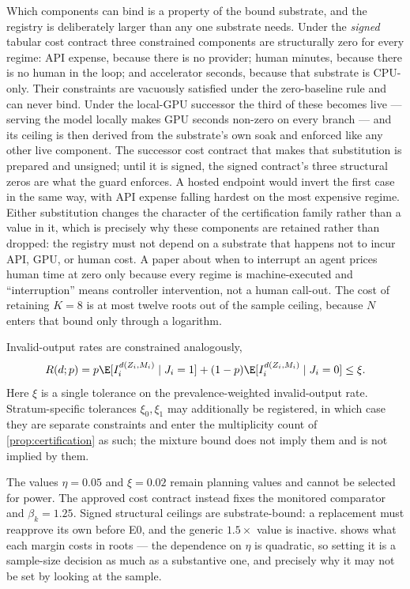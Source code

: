 Which components can bind is a property of the bound substrate, and the registry
is deliberately larger than any one substrate needs.  Under the \emph{signed}
tabular cost contract three constrained components are structurally zero for
every regime: API expense, because there is no provider; human minutes, because
there is no human in the loop; and accelerator seconds, because that substrate
is CPU-only.  Their constraints are vacuously satisfied under the zero-baseline
rule and can never bind.  Under the local-GPU successor the third of these
becomes live --- serving the model locally makes GPU seconds non-zero on every
branch --- and its ceiling is then derived from the substrate's own soak and
enforced like any other live component.  The successor cost contract that makes
that substitution is prepared and unsigned; until it is signed, the signed
contract's three structural zeros are what the guard enforces.  A hosted endpoint would invert the first case in the same way,
with API expense falling hardest on the most expensive regime.  Either
substitution changes the character of the certification family rather than a
value in it, which is precisely why these components are retained rather than
dropped: the registry must not depend on a
substrate that happens not to incur API, GPU, or human cost.  A paper about when
to interrupt an agent prices human time at zero only because every regime is
machine-executed and ``interruption'' means controller intervention, not a human
call-out.  The cost of retaining $K=8$ is at most twelve roots out of the sample
ceiling, because $N$ enters that bound only through a logarithm.

Invalid-output rates are constrained analogously,
\begin{equation}
 R(d;p)=p\E[I_i^{d(Z_i,M_i)}\mid J_i=1]
 +(1-p)\E[I_i^{d(Z_i,M_i)}\mid J_i=0]
 \le \xi.
 \label{eq:invalid-constraint}
\end{equation}
Here $\xi$ is a single tolerance on the prevalence-weighted invalid-output rate.
Stratum-specific tolerances $\xi_0,\xi_1$ may additionally be registered, in
which case they are separate constraints and enter the multiplicity count of
\cref{prop:certification} as such; the mixture bound does not imply them and is
not implied by them.

The values $\eta=0.05$ and $\xi=0.02$ remain planning values and cannot be
selected for power.  The approved cost contract instead fixes the monitored
comparator and $\beta_k=1.25$.  Signed structural ceilings are substrate-bound:
a replacement must reapprove its own before E0, and the generic $1.5\times$
value is inactive.   shows what each margin costs in roots --- the
dependence on $\eta$ is quadratic, so setting it is a sample-size decision as
much as a substantive one, and precisely why it may not be set by looking at
the sample.

